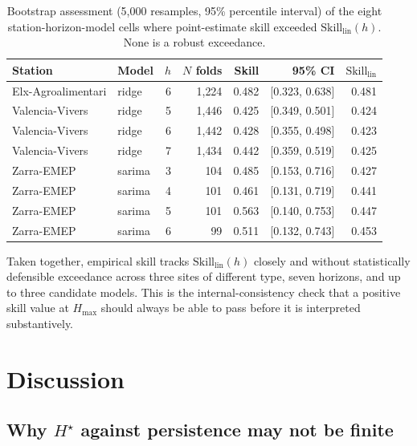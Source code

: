 \documentclass{article}
\newcommand{\hstar}{H^{\star}}
\begin{document}
\begin{table}[t]
\centering
\small
\caption{Bootstrap assessment (5{,}000 resamples, 95\% percentile interval) of
  the eight station-horizon-model cells where point-estimate skill exceeded
  $\mathrm{Skill}_{\mathrm{lin}}(h)$. None is a robust exceedance.}
\label{tab:bootstrap}
\begin{tabular}{@{}llrrrrr@{}}
\toprule
Station & Model & $h$ & $N$ folds & Skill & 95\% CI & $\mathrm{Skill}_{\mathrm{lin}}$ \\
\midrule
Elx-Agroalimentari & ridge  & 6 & 1{,}224 & 0.482 & [0.323, 0.638] & 0.481 \\
Valencia-Vivers     & ridge  & 5 & 1{,}446 & 0.425 & [0.349, 0.501] & 0.424 \\
Valencia-Vivers     & ridge  & 6 & 1{,}442 & 0.428 & [0.355, 0.498] & 0.423 \\
Valencia-Vivers     & ridge  & 7 & 1{,}434 & 0.442 & [0.359, 0.519] & 0.425 \\
Zarra-EMEP          & sarima & 3 &   104   & 0.485 & [0.153, 0.716] & 0.427 \\
Zarra-EMEP          & sarima & 4 &   101   & 0.461 & [0.131, 0.719] & 0.441 \\
Zarra-EMEP          & sarima & 5 &   101   & 0.563 & [0.140, 0.753] & 0.447 \\
Zarra-EMEP          & sarima & 6 &    99   & 0.511 & [0.132, 0.743] & 0.453 \\
\bottomrule
\end{tabular}
\end{table}

Taken together, empirical skill tracks $\mathrm{Skill}_{\mathrm{lin}}(h)$
closely and without statistically defensible exceedance across three sites of
different type, seven horizons, and up to three candidate models.
This is the internal-consistency check that a positive skill value at
$H_{\max}$ should always be able to pass before it is interpreted
substantively.

\section{Discussion}

\subsection{Why $\hstar$ against persistence may not be finite}
\end{document}
